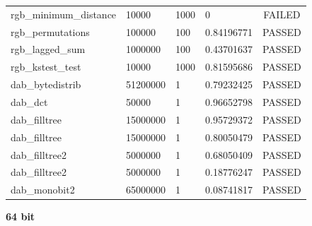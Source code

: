 \documentclass[titlepage, 11pt]{article}
\begin{document}
\begin{table}[!htb]
\begin{tabular}{l|l|l|l|c}
rgb\_minimum\_distance & 10000 & 1000 & 0 & FAILED \\
rgb\_permutations & 100000 & 100 & 0.84196771 & PASSED \\
rgb\_lagged\_sum & 1000000 & 100 & 0.43701637 & PASSED \\
rgb\_kstest\_test & 10000 & 1000 & 0.81595686 & PASSED \\
dab\_bytedistrib & 51200000 & 1 & 0.79232425 & PASSED \\
dab\_dct & 50000 & 1 & 0.96652798 & PASSED \\
dab\_filltree & 15000000 & 1 & 0.95729372 & PASSED \\
dab\_filltree & 15000000 & 1 & 0.80050479 & PASSED \\
dab\_filltree2 & 5000000 & 1 & 0.68050409 & PASSED \\
dab\_filltree2 & 5000000 & 1 & 0.18776247 & PASSED \\
dab\_monobit2 & 65000000 & 1 & 0.08741817 & PASSED
\end{tabular}
\end{table}

\newpage
\noindent \textbf{64 bit}
\end{document}
